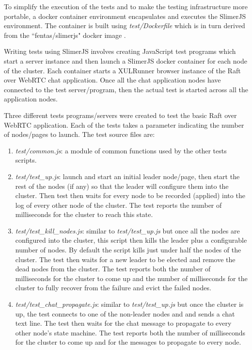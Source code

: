 \documentclass[conference,compsoc]{./IEEEtran/IEEEtran}
\begin{document}
To simplify the execution of the tests and to make the testing infrastructure more portable, a docker container environment encapsulates and executes the SlimerJS environment. The container is built using \emph{test/Dockerfile} which is in turn derived from the ``fentas/slimerjs" docker image \cite{fentas:slimerjs}.

Writing tests using SlimerJS involves creating JavaScript test programs which start a server instance and then launch a SlimerJS docker container for each node of the cluster. Each container starts a XULRunner browser instance of the Raft over WebRTC chat application. Once all the chat application nodes have connected to the test server/program, then the actual test is started across all the application nodes.

Three different tests programs/servers were created to test the basic Raft over WebRTC application. Each of the tests takes a parameter indicating the number of nodes/pages to launch. The test source files are:

\begin{enumerate}
\item \emph{test/common.js}: a module of common functions used by the other tests scripts.
\item \emph{test/test\_up.js}: launch and start an initial leader node/page, then start the rest of the nodes (if any) so that the leader will configure them into the cluster. Then test then waits for every node to be recorded (applied) into the log of every other node of the cluster. The test reports the number of milliseconds for the cluster to reach this state.
\item \emph{test/test\_kill\_nodes.js}: similar to \emph{test/test\_up.js} but once all the nodes are configured into the cluster, this script then kills the leader plus a configurable number of nodes. By default the script kills just under half the nodes of the cluster. The test then waits for a new leader to be elected and remove the dead nodes from the cluster. The test reports both the number of milliseconds for the cluster to come up and the number of milliseconds for the cluster to fully recover from the failure and evict the failed nodes.
\item \emph{test/test\_chat\_propagate.js}: similar to \emph{test/test\_up.js} but once the cluster is up, the test connects to one of the non-leader nodes and and sends a chat text line. The test then waits for the chat message to propagate to every other node's state machine. The test reports both the number of milliseconds for the cluster to come up and for the messages to propagate to every node.
\end{enumerate}
\end{document}
